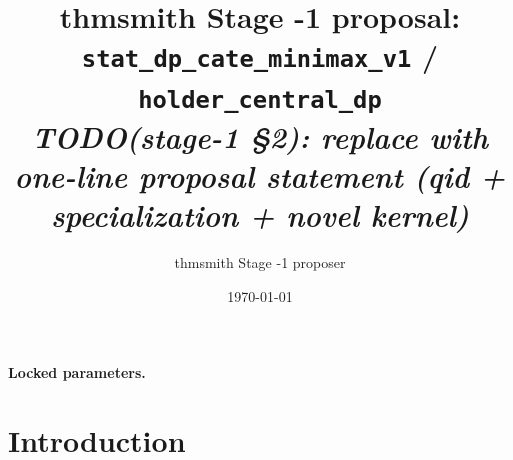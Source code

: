 \documentclass[11pt]{article}
\title{thmsmith Stage -1 proposal: \texttt{stat\_dp\_cate\_minimax\_v1} / \texttt{holder\_central\_dp}%
  \\ \large\textit{TODO(stage-1 \S2): replace with one-line proposal statement (qid + specialization + novel kernel)}}
\author{thmsmith Stage -1 proposer}
\date{\today}
\theoremstyle{definition}
\theoremstyle{plain}
\theoremstyle{remark}
\begin{document}
\maketitle


\paragraph{Locked parameters.}

\begin{abstract}
\end{abstract}

\section{Introduction}
%
%
%
%
\end{document}
